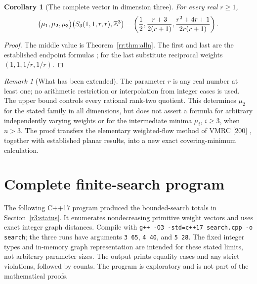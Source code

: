 \documentclass[11pt,a4paper]{article}
\newtheorem{corollary}[theorem]{Corollary}
\theoremstyle{remark}\newtheorem{remark}[theorem]{Remark}
\begin{document}
\begin{corollary}[The complete vector in dimension three]
\label{rr:cor:vector}
For every real $r\ge1$,
\[
 \bigl(\mu_1,\mu_2,\mu_3\bigr)\bigl(S_3(1,1,r,r),\mathbb Z^3\bigr)
 =\left(\frac12,\frac{r+3}{2(r+1)},
              \frac{r^2+4r+1}{2r(r+1)}\right).
\]
\end{corollary}
\begin{proof}
The middle value is Theorem~\ref{rr:thm:alln}.  The first and
last are the established endpoint formulas
\cite[Theorem 1.4 and the discussion after Conjecture 5.3]{CSS};
for the last substitute reciprocal weights $(1,1,1/r,1/r)$.
\end{proof}

\begin{remark}[What has been extended]
The parameter $r$ is any real number at least one; no arithmetic
restriction or interpolation from integer cases is used.  The
upper bound controls every rational rank-two quotient.  This
determines $\mu_2$ for the stated family in all dimensions, but
does not assert a formula for arbitrary independently varying
weights or for the intermediate minima $\mu_i$, $i\ge3$, when
$n>3$.  The proof transfers the elementary weighted-flow method
of VMRC [200] \cite{VMRC200}, together with established planar
results, into a new exact covering-minimum calculation.
\end{remark}



\clearpage
\section{Complete finite-search program}
\label{app:search}
The following C++17 program produced the bounded-search totals in
Section~\ref{r3:status}. It enumerates nondecreasing primitive weight
vectors and uses exact integer graph distances. Compile with
\texttt{g++ -O3 -std=c++17 search.cpp -o search}; the three runs have
arguments \texttt{3 65}, \texttt{4 40}, and \texttt{5 28}.
The fixed integer types and in-memory graph representation are intended
for these stated limits, not arbitrary parameter sizes. The output
prints equality cases and any strict violations, followed by counts.
The program is exploratory and is not part of the mathematical proofs.
\end{document}
